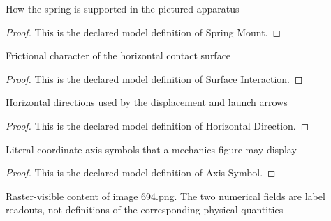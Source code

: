 \begin{definition}
  \label{def:physics:phyx-mini-0694:phyxminiproblems-problemphyxmini0694-springmount}
  How the spring is supported in the pictured apparatus
\end{definition}
\begin{proof}
  This is the declared model definition of Spring Mount.
\end{proof}
\begin{definition}
  \label{def:physics:phyx-mini-0694:phyxminiproblems-problemphyxmini0694-surfaceinteraction}
  Frictional character of the horizontal contact surface
\end{definition}
\begin{proof}
  This is the declared model definition of Surface Interaction.
\end{proof}
\begin{definition}
  \label{def:physics:phyx-mini-0694:phyxminiproblems-problemphyxmini0694-horizontaldirection}
  Horizontal directions used by the displacement and launch arrows
\end{definition}
\begin{proof}
  This is the declared model definition of Horizontal Direction.
\end{proof}
\begin{definition}
  \label{def:physics:phyx-mini-0694:phyxminiproblems-problemphyxmini0694-axissymbol}
  Literal coordinate-axis symbols that a mechanics figure may display
\end{definition}
\begin{proof}
  This is the declared model definition of Axis Symbol.
\end{proof}
\begin{definition}
  \label{def:physics:phyx-mini-0694:phyxminiproblems-problemphyxmini0694-springcubefigure}
  Raster-visible content of image 694.png. The two numerical fields are label readouts, not definitions of the corresponding physical quantities
\end{definition}
